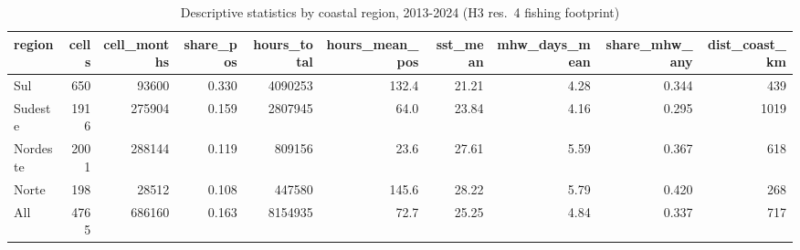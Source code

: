 \begin{table}[htbp]
\centering
\caption{Descriptive statistics by coastal region, 2013-2024 (H3 res.\ 4 fishing footprint)}
\label{tab:desc}
\begin{tabular}{lrrrrrrrrr}
\hline
region & cells & cell\_months & share\_pos & hours\_total & hours\_mean\_pos & sst\_mean & mhw\_days\_mean & share\_mhw\_any & dist\_coast\_km
\\ \hline
Sul &  650 &  93600 & 0.330 & 4090253 & 132.4 & 21.21 & 4.28 & 0.344 &  439 \\
Sudeste & 1916 & 275904 & 0.159 & 2807945 &  64.0 & 23.84 & 4.16 & 0.295 & 1019 \\
Nordeste & 2001 & 288144 & 0.119 &  809156 &  23.6 & 27.61 & 5.59 & 0.367 &  618 \\
Norte &  198 &  28512 & 0.108 &  447580 & 145.6 & 28.22 & 5.79 & 0.420 &  268 \\
All & 4765 & 686160 & 0.163 & 8154935 &  72.7 & 25.25 & 4.84 & 0.337 &  717 \\
\hline
\end{tabular}
\end{table}
